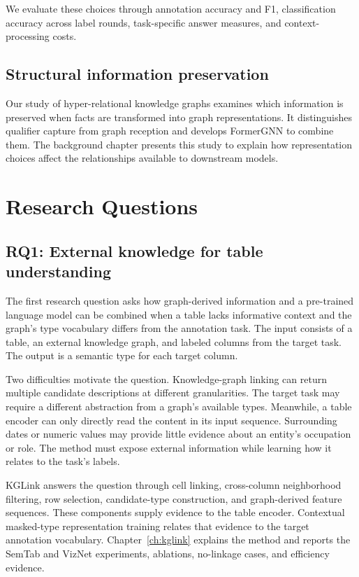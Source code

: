 We evaluate these choices through annotation accuracy and F1, classification accuracy across label rounds, task-specific answer measures, and context-processing costs.

\subsection{Structural information preservation}
Our study of hyper-relational knowledge graphs examines which information is preserved when facts are transformed into graph representations. It distinguishes qualifier capture from graph reception and develops FormerGNN to combine them. The background chapter presents this study to explain how representation choices affect the relationships available to downstream models.

\section{Research Questions}
\label{sec:introduction:questions}
\subsection{RQ1: External knowledge for table understanding}
The first research question asks how graph-derived information and a pre-trained language model can be combined when a table lacks informative context and the graph's type vocabulary differs from the annotation task. The input consists of a table, an external knowledge graph, and labeled columns from the target task. The output is a semantic type for each target column.

Two difficulties motivate the question. Knowledge-graph linking can return multiple candidate descriptions at different granularities. The target task may require a different abstraction from a graph's available types. Meanwhile, a table encoder can only directly read the content in its input sequence. Surrounding dates or numeric values may provide little evidence about an entity's occupation or role. The method must expose external information while learning how it relates to the task's labels.

KGLink answers the question through cell linking, cross-column neighborhood filtering, row selection, candidate-type construction, and graph-derived feature sequences. These components supply evidence to the table encoder. Contextual masked-type representation training relates that evidence to the target annotation vocabulary. Chapter~\ref{ch:kglink} explains the method and reports the SemTab and VizNet experiments, ablations, no-linkage cases, and efficiency evidence.

